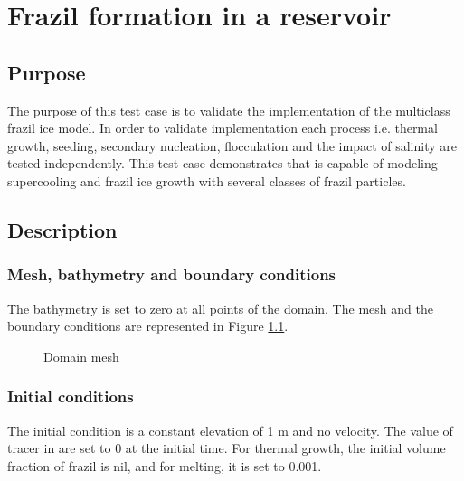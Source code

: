 \renewcommand{\labelitemi}{$\triangleright$}

\chapter{Frazil formation in a reservoir}
%
%
\section{Purpose}

The purpose of this test case is to validate the implementation of the multiclass frazil ice model.
In order to validate implementation each process i.e. thermal growth, 
seeding, secondary nucleation, flocculation and the impact of salinity are tested independently.
This test case demonstrates that \khione is capable of modeling 
supercooling and frazil ice growth with several classes of frazil particles.

\section{Description}

\subsection{Mesh, bathymetry and boundary conditions}

The bathymetry is set to zero at all points of the domain. The mesh and the boundary conditions are represented in Figure \ref{fig:res_mesh}.

\begin{figure}[H]
    \begin{center}
    \end{center}
    \caption{Domain mesh}
    \label{fig:res_mesh}
\end{figure}

\subsection{Initial conditions}

The initial condition is a constant elevation of 1 m and no velocity. The value of tracer in  are set to 0 at the initial time. For thermal growth, the initial volume fraction of frazil is nil, and for melting, it is set to 0.001.

